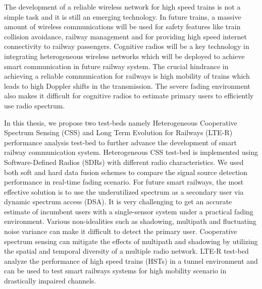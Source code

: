 The development of a reliable wireless network for high speed trains is not a simple task and it is still an emerging technology. In future trains, a massive amount of wireless communications will be used for safety features like train collision avoidance, railway management and for providing high speed internet connectivity to railway passengers. Cognitive radios will be a key technology in integrating heterogeneous wireless networks which will be deployed to achieve smart communication in future railway system. The crucial hindrance in achieving a reliable communication for railways is high mobility of trains which leads to high Doppler shifts in the transmission. The severe fading environment also makes it difficult for cognitive radios to estimate primary users to efficiently use radio spectrum.

In this thesis, we propose two test-beds namely Heterogeneous Cooperative Spectrum Sensing (CSS) and Long Term Evolution for Railways (LTE-R) performance analysis test-bed to further advance the development of smart railway communication system. Heterogeneous CSS test-bed is implemented using Software-Defined Radios (SDRs) with different radio characteristics. We used both soft and hard data fusion schemes to compare the signal source detection performance in real-time fading scenario. For future smart railways, the most effective solution is to use the underutilized spectrum as a secondary user via dynamic spectrum access (DSA). It is very challenging to get an accurate estimate of incumbent users with a single-sensor system under a practical fading environment. Various non-idealities such as shadowing, multipath and fluctuating noise variance can make it difficult to detect the primary user. Cooperative spectrum sensing can mitigate the effects of multipath and shadowing by utilizing the spatial and temporal diversity of a multiple radio network. LTE-R test-bed analyze the performance of high speed trains (HSTs) in a tunnel environment and can be used to test smart railways systems for high mobility scenario in drastically impaired channels.

